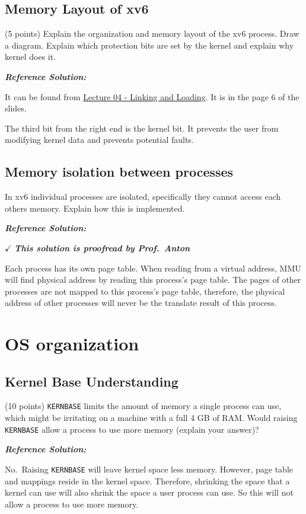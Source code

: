 \documentclass[]{article}
\begin{document}
\hypertarget{memory-layout-of-xv6}{%
\subsection{Memory Layout of xv6}\label{memory-layout-of-xv6}}

(5 points) Explain the organization and memory layout of the xv6
process. Draw a diagram. Explain which protection bits are set by the
kernel and explain why kernel does it.

\textbf{\emph{Reference Solution:}}

It can be found from
\href{https://www.ics.uci.edu/~aburtsev/143A/lectures/lecture04-linking-and-loading/lecture04-linking-and-loading.pdf}{Lecture
04 - Linking and Loading}. It is in the page 6 of the slides.

The third bit from the right end is the kernel bit. It prevents the user
from modifying kernel data and prevents potential faults.

\hypertarget{memory-isolation-between-processes}{%
\subsection{Memory isolation between
processes}\label{memory-isolation-between-processes}}

In xv6 individual processes are isolated, specifically they cannot
access each others memory. Explain how this is implemented.

\textbf{\emph{Reference Solution:}}

\(\checkmark\) \textbf{\emph{This solution is proofread by Prof.~Anton}}

Each process has its own page table. When reading from a virtual
address, MMU will find physical address by reading this process's page
table. The pages of other processes are not mapped to this process's
page table, therefore, the physical address of other processes will
never be the translate result of this process.

\hypertarget{os-organization}{%
\section{OS organization}\label{os-organization}}

\hypertarget{kernel-base-understanding}{%
\subsection{Kernel Base Understanding}\label{kernel-base-understanding}}

(10 points) \texttt{KERNBASE} limits the amount of memory a single
process can use, which might be irritating on a machine with a full 4 GB
of RAM. Would raising \texttt{KERNBASE} allow a process to use more
memory (explain your answer)?

\textbf{\emph{Reference Solution:}}

No.~Raising \texttt{KERNBASE} will leave kernel space less memory.
However, page table and mappings reside in the kernel space. Therefore,
shrinking the space that a kernel can use will also shrink the space a
user process can use. So this will not allow a process to use more
memory.
\end{document}
